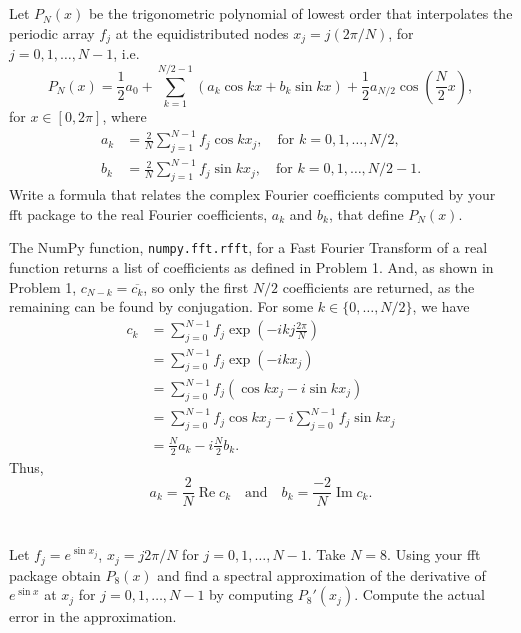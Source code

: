 \documentclass[12pt]{article}
\newenvironment{problem}
    {\begin{lrbox}{\mybox}\begin{minipage}{0.98\textwidth}}
    {\end{minipage}\end{lrbox}\framebox[\textwidth]{\usebox{\mybox}}}
\newcommand{\isp}[1]{\quad\text{#1}\quad}
\newcommand{\<}{\left\langle}
\renewcommand{\>}{\right\rangle}
\newcommand{\conj}[1]{\overline{#1}}
\newcommand{\expp}[1]{\exp\!\left( #1 \right)}
\renewcommand{\Im}{\operatorname{Im}}
\renewcommand{\Re}{\operatorname{Re}}
\begin{document}
\newpage
\section{}
\begin{problem}
    Let $P_N(x)$ be the trigonometric polynomial of lowest order that interpolates the periodic array $f_j$ at the equidistributed nodes $x_j = j(2\pi / N)$, for $j = 0, 1, \dots, N - 1$, i.e.
    \[
        P_N(x) = \frac12 a_0 + \sum_{k=1}^{N/2-1} (a_k \cos kx + b_k \sin kx) + \frac12 a_{N/2} \cos \left( \frac{N}{2} x \right),
    \]
    for $x \in [0, 2\pi]$, where
    \begin{align*}
        a_k &= \frac2N \sum_{j=1}^{N-1} f_j \cos kx_j, \quad \text{for $k = 0, 1, \dots, N/2$}, \\
        b_k &= \frac2N \sum_{j=1}^{N-1} f_j \sin kx_j, \quad \text{for $k = 0, 1, \dots, N/2 - 1$}.
    \end{align*}
    Write a formula that relates the complex Fourier coefficients computed by your fft package to the real Fourier coefficients, $a_k$ and $b_k$, that define $P_N(x)$.
\end{problem}
\medskip

The NumPy function, \lstinline{numpy.fft.rfft}, for a Fast Fourier Transform of a real function returns a list of coefficients as defined in Problem 1. And, as shown in Problem 1, $c_{N-k} = \conj{c_k}$, so only the first $N/2$ coefficients are returned, as the remaining can be found by conjugation. For some $k \in \{0, \dots, N/2\}$, we have
\begin{align*}
    c_k
        &= \sum_{j=0}^{N-1} f_j \expp{-i k j\tfrac{2\pi}{N}} \\
        &= \sum_{j=0}^{N-1} f_j \expp{-i k x_j} \\
        &= \sum_{j=0}^{N-1} f_j (\cos kx_j - i \sin kx_j) \\
        &= \sum_{j=0}^{N-1} f_j \cos kx_j - i \sum_{j=0}^{N-1} f_j \sin kx_j \\
        &= \frac{N}{2} a_k - i \frac{N}{2} b_k.
\end{align*}
Thus,
\[
    a_k = \frac{2}{N} \Re c_k \isp{and} b_k = \frac{-2}{N} \Im c_k.
\]

\section{}
\begin{problem}
    Let $f_j = e^{\sin x_j}$, $x_j = j2\pi/N$ for $j = 0, 1, \dots, N-1$. Take $N = 8$. Using your fft package obtain $P_8(x)$ and find a spectral approximation of the derivative of $e^{\sin x}$ at $x_j$ for $j = 0, 1, \dots, N-1$ by computing $P_8'(x_j)$. Compute the actual error in the approximation.
\end{problem}
\medskip
\end{document}
